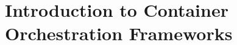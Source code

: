 %
%

\pagebreak
\section{Introduction to Container Orchestration Frameworks}

\onehalfspacing

\blindtext

